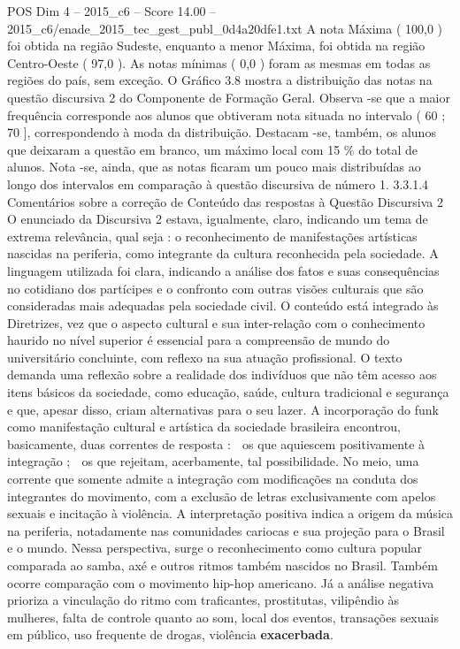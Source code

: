 \begin{textsample}{POS Dim 4 – 2015\_c6 – Score 14.00 – 2015\_c6/enade\_2015\_tec\_gest\_publ\_0d4a20dfe1.txt}
A nota Máxima ( 100,0 ) foi obtida na região Sudeste, enquanto a menor Máxima, foi obtida na região Centro-Oeste ( 97,0 ).
As notas mínimas ( 0,0 ) foram as mesmas em todas as regiões do país, sem exceção.
O Gráfico 3.8 mostra a distribuição das notas na questão discursiva 2 do Componente de Formação Geral.
Observa -se que a maior frequência corresponde aos alunos que obtiveram nota situada no intervalo ( 60 ; 70 ], correspondendo à moda da distribuição.
Destacam -se, também, os alunos que deixaram a questão em branco, um máximo local com 15 \% do total de alunos.
Nota -se, ainda, que as notas ficaram um pouco mais distribuídas ao longo dos intervalos em comparação à questão discursiva de número 1. 3.3.1.4 Comentários sobre a correção de Conteúdo das respostas à Questão Discursiva 2 O enunciado da Discursiva 2 estava, igualmente, claro, indicando um tema de extrema relevância, qual seja : o reconhecimento de manifestações artísticas nascidas na periferia, como integrante da cultura reconhecida pela sociedade.
A linguagem utilizada foi clara, indicando a análise dos fatos e suas consequências no cotidiano dos partícipes e o confronto com outras visões culturais que são consideradas mais adequadas pela sociedade civil.
O conteúdo está integrado às Diretrizes, vez que o aspecto cultural e sua inter-relação com o conhecimento haurido no nível superior é essencial para a compreensão de mundo do universitário concluinte, com reflexo na sua atuação profissional.
O texto demanda uma reflexão sobre a realidade dos indivíduos que não têm acesso aos itens básicos da sociedade, como educação, saúde, cultura tradicional e segurança e que, apesar disso, criam alternativas para o seu lazer.
A incorporação do funk como manifestação cultural e artística da sociedade brasileira encontrou, basicamente, duas correntes de resposta :  os que aquiescem positivamente à integração ;  os que rejeitam, acerbamente, tal possibilidade.
No meio, uma corrente que somente admite a integração com modificações na conduta dos integrantes do movimento, com a exclusão de letras exclusivamente com apelos sexuais e incitação à violência.
A interpretação positiva indica a origem da música na periferia, notadamente nas comunidades cariocas e sua projeção para o Brasil e o mundo.
Nessa perspectiva, surge o reconhecimento como cultura popular comparada ao samba, axé e outros ritmos também nascidos no Brasil.
Também ocorre comparação com o movimento hip-hop americano.
Já a análise negativa prioriza a vinculação do ritmo com traficantes, prostitutas, vilipêndio às mulheres, falta de controle quanto ao som, local dos eventos, transações sexuais em público, uso frequente de drogas, violência \textbf{exacerbada}.

\end{textsample}
